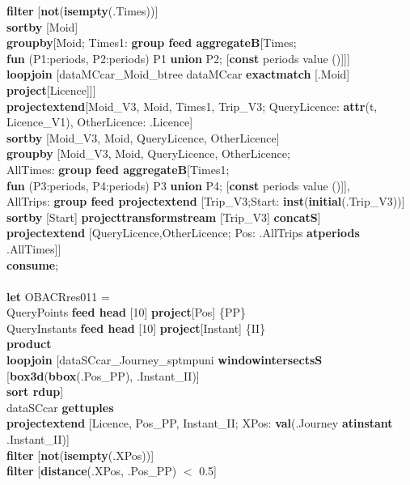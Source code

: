 \documentclass[a4paper]{article}
\newcommand{\op}[1]{\textbf{#1}}
\begin{document}
\begin{scriptsize}
\begin{tabbing}
\>\>\>\op{filter} [\op{not}(\op{isempty}(.Times))]\\
\>\>\>\op{sortby} [Moid]\\
\>\>\>\op{groupby}[Moid; Times1: \op{group feed aggregateB}[Times;\\
\>\>\>\>\>\op{fun} (P1:periods, P2:periods) P1 \op{union} P2; [\op{const} periods value ()]]]\\
\>\>\>\op{loopjoin} [dataMCcar\_Moid\_btree dataMCcar \op{exactmatch} [.Moid]\\
\>\>\>\>\op{project}[Licence]]]\\
\>\>\op{projectextend}[Moid\_V3, Moid, Times1, Trip\_V3; QueryLicence: \op{attr}(t, Licence\_V1), OtherLicence: .Licence]\\
\>\>\op{sortby} [Moid\_V3, Moid, QueryLicence, OtherLicence]\\
\>\>\op{groupby} [Moid\_V3, Moid, QueryLicence, OtherLicence;\\
\>\>\>\>AllTimes: \op{group feed aggregateB}[Times1;\\
\>\>\>\>\>\>\op{fun} (P3:periods, P4:periods) P3 \op{union} P4; [\op{const} periods value ()]],\\
\>\>\>\>AllTrips: \op{group feed projectextend} [Trip\_V3;Start: \op{inst}(\op{initial}(.Trip\_V3))]\\
\>\>\>\>\>\>\op{sortby} [Start] \op{projecttransformstream} [Trip\_V3] \op{concatS}]\\
\>\>\op{projectextend} [QueryLicence,OtherLicence; Pos: .AllTrips \op{atperiods} .AllTimes]]\\
\op{consume};\\
\\
\op{let} OBACRres011 =\\
\>QueryPoints \op{feed head} [10] \op{project}[Pos] \{PP\}\\
\>QueryInstants \op{feed head} [10] \op{project}[Instant] \{II\}\\
\>\op{product}\\
\>\op{loopjoin} [dataSCcar\_Journey\_sptmpuni \op{windowintersectsS} [\op{box3d}(\op{bbox}(.Pos\_PP), .Instant\_II)]\\
\>\>\op{sort rdup}]\\
\>dataSCcar \op{gettuples}\\
\>\op{projectextend} [Licence, Pos\_PP, Instant\_II; XPos: \op{val}(.Journey \op{atinstant} .Instant\_II)]\\
\>\op{filter} [\op{not}(\op{isempty}(.XPos))]\\
\>\op{filter} [\op{distance}(.XPos, .Pos\_PP) $<$ 0.5]\\

\end{tabbing}
\end{scriptsize}
\end{document}
